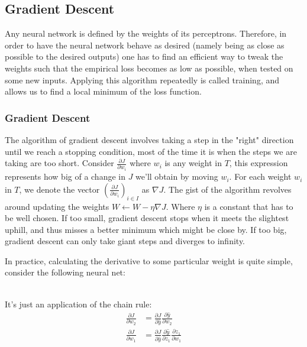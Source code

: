 \documentclass{article}
\theoremstyle{plain}
\theoremstyle{definition}
\theoremstyle{remark}
\begin{document}
\subsection{Gradient Descent}
	Any neural network is defined by the weights of its perceptrons. Therefore, in order to have the neural network behave as desired (namely being as close as possible to the desired outputs) one has to find an efficient way to tweak the weights such that the empirical loss becomes as low as possible, when tested on some new inputs. Applying this algorithm repeatedly is called training, and allows us to find a local minimum of the loss function.
	\subsubsection{Gradient Descent}
		 The algorithm of gradient descent involves taking a step in the "right" direction until we reach a stopping condition, most of the time it is when the steps we are taking are too short. Consider $ \frac{\partial J}{\partial w_i} $ where $w_i$ is any weight in $T$, this expression represents how big of a change in $J$ we’ll obtain by moving $w_i$. For each weight $w_i$ in $T$, we denote the vector $ \left(\frac{\partial J}{\partial w_i} \right)_{i\in I} $ as $\nabla J$. The gist of the algorithm revolves around updating the weights $W \gets W - \eta \nabla J$. Where $\eta$ is a constant that has to be well chosen. If too small, gradient descent stops when it meets the slightest uphill, and thus misses a better minimum which might be close by. If too big, gradient descent can only take giant steps and diverges to infinity.


		In practice, calculating the derivative to some particular weight is quite simple, consider the following neural net: \\ \\
		\begin{minipage}{0.55\linewidth}

		\end{minipage}
	\begin{minipage}{0.45\linewidth}
		It's just an application of the chain rule:
		\begin{align*}
		\frac{\partial J}{\partial w_2} &=\frac{\partial J}{\partial \hat{y}} \frac{\partial \hat{y}}{\partial w_2} \\
		\frac{\partial J}{\partial w_1} &= \frac{\partial J}{\partial \hat{y}}\frac{\partial \hat{y}}{\partial z_1}\frac{\partial z_1}{\partial w_1}
		\end{align*}
	\end{minipage}
\end{document}
